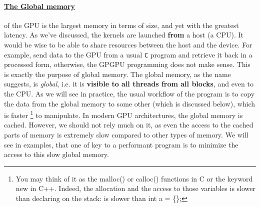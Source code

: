 \vspace{-15pt}
\paragraph{\underline{The Global memory}} of the GPU is the largest memory in terms of size, and yet with the greatest latency.
As we've discussed, the kernels are launched \textbf{from} a host (a CPU). It would be wise to be able to share 
resources between the host and the device. For example, send data to the GPU from a usual \verb|C| program
and retrieve it back in a processed form, otherwise, the GPGPU programming does not make sense. 
This is exactly the purpose of global memory. The global memory, as the 
name suggests, is \textsl{global}, i.e. it is \textbf{visible to all threads from all blocks}, and even to the CPU. As we will see in practice,
the usual workflow of the program is to copy the data from the global memory to some other (which is discussed below), 
which is faster \footnote{You may think of it as the {\selectfont malloc()} or {\selectfont calloc()} functions in C
or the keyword {\selectfont new} in C++. Indeed, the allocation and the access to those variables is slower than 
declaring on the stack: is slower than {\selectfont int a = \{\};}}  
to manipulate. In modern GPU architectures, the global memory is cached. However, we should not rely much on it, 
as even the access to the cached parts of memory is extremely slow compared to other types of memory. We will see in examples, that one of key to a performant program is to minimize the access to this 
slow global memory.

\vspace{-15pt}
